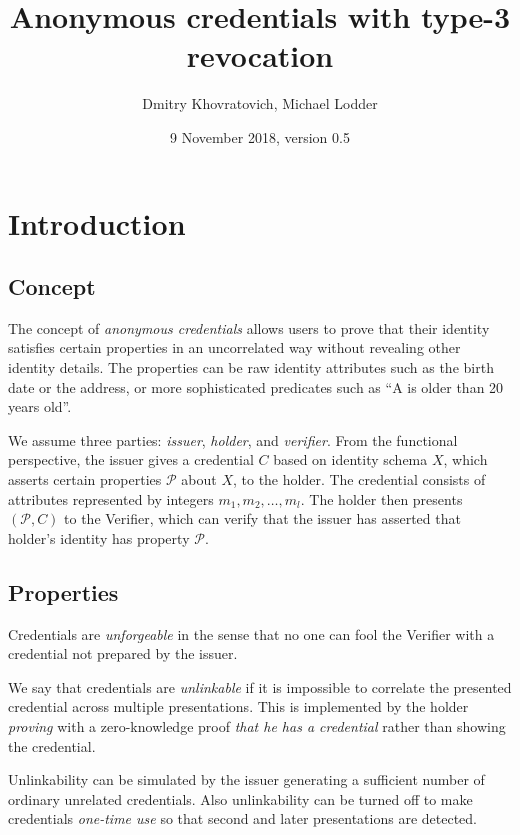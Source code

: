 \documentclass[a4paper]{article}
\title{Anonymous credentials with type-3 revocation}
\author{Dmitry Khovratovich, Michael Lodder}
\date{9 November 2018, version 0.5}
\begin{document}
\maketitle

\section{Introduction}\label{sec:intro}
\subsection{Concept}

The concept of \emph{anonymous credentials} allows users to prove that their identity satisfies certain properties in an uncorrelated way without revealing other identity details.  The properties can be raw identity attributes  such as
the birth date or the address, or more sophisticated predicates such as ``A is older than 20 years old''.

We assume three parties: \emph{issuer}, \emph{holder}, and \emph{verifier}. From the functional perspective, the issuer gives a credential $C$ based on identity schema $X$, which asserts certain properties $\mathcal{P}$ about $X$, to the holder. The credential consists of attributes represented by integers $m_1, m_2,\ldots, m_l$. The holder then presents $(\mathcal{P},C)$  to the Verifier, which can verify that the issuer has asserted that holder's identity has property $\mathcal{P}$.

\subsection{Properties}

Credentials are \emph{unforgeable} in the sense that no one can fool the Verifier with a credential not prepared by the issuer.

We say that credentials are  \emph{unlinkable} if it is impossible to correlate the presented credential across multiple presentations. This is implemented by the holder \emph{proving} with a zero-knowledge proof \emph{that he has a credential} rather than showing the credential.

Unlinkability can be simulated by the issuer generating a sufficient number of ordinary unrelated credentials. Also unlinkability can be turned off to make credentials \emph{one-time use} so that second and later presentations are detected.
\end{document}
